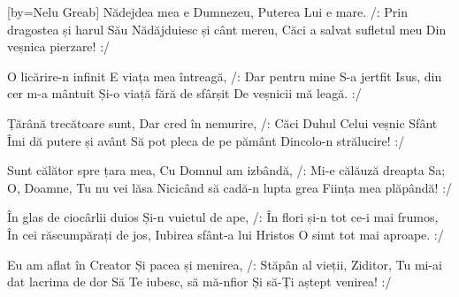 [by={Nelu Greab}]
\beginverse
Nădejdea mea e Dumnezeu,
Puterea Lui e mare.
/: Prin dragostea și harul Său
Nădăjduiesc și cânt mereu,
Căci a salvat sufletul meu
Din veșnica pierzare! :/
\endverse

\beginverse
O licărire-n infinit
E viața mea întreagă,
/: Dar pentru mine S-a jertfit
Isus, din cer m-a mântuit
Și-o viață fără de sfârșit
De veșnicii mă leagă. :/
\endverse

\beginverse
Țărână trecătoare sunt,
Dar cred în nemurire,
/: Căci Duhul Celui veșnic Sfânt
Îmi dă putere și avânt
Să pot pleca de pe pământ
Dincolo-n strălucire! :/
\endverse

\beginverse
Sunt călător spre țara mea,
Cu Domnul am izbândă,
/: Mi-e călăuză dreapta Sa;
O, Doamne, Tu nu vei lăsa
Nicicând să cadă-n lupta grea
Ființa mea plăpândă! :/
\endverse

\beginverse
În glas de ciocârlii duios
Și-n vuietul de ape,
/: În flori și-n tot ce-i mai frumos,
În cei răscumpărați de jos,
Iubirea sfânt-a lui Hristos
O simt tot mai aproape. :/
\endverse

\beginverse
Eu am aflat în Creator
Și pacea și menirea,
/: Stăpân al vieții, Ziditor,
Tu mi-ai dat lacrima de dor
Să Te iubesc, să mă-nfior
Și să-Ți aștept venirea! :/
\endverse
\endsong